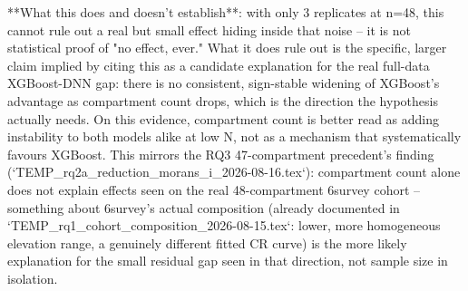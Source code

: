 **What this does and doesn't establish**: with only 3 replicates at n=48, this cannot rule out a
real but small effect hiding inside that noise -- it is not statistical proof of "no effect,
ever." What it does rule out is the specific, larger claim implied by citing this as a candidate
explanation for the real full-data XGBoost-DNN gap: there is no consistent, sign-stable widening
of XGBoost's advantage as compartment count drops, which is the direction the hypothesis actually
needs. On this evidence, compartment count is better read as adding instability to both models
alike at low N, not as a mechanism that systematically favours XGBoost. This mirrors the RQ3
47-compartment precedent's finding (`TEMP_rq2a_reduction_morans_i_2026-08-16.tex`): compartment
count alone does not explain effects seen on the real 48-compartment 6survey cohort -- something
about 6survey's actual composition (already documented in
`TEMP_rq1_cohort_composition_2026-08-15.tex`: lower, more homogeneous elevation range, a
genuinely different fitted CR curve) is the more likely explanation for the small residual gap
seen in that direction, not sample size in isolation.
